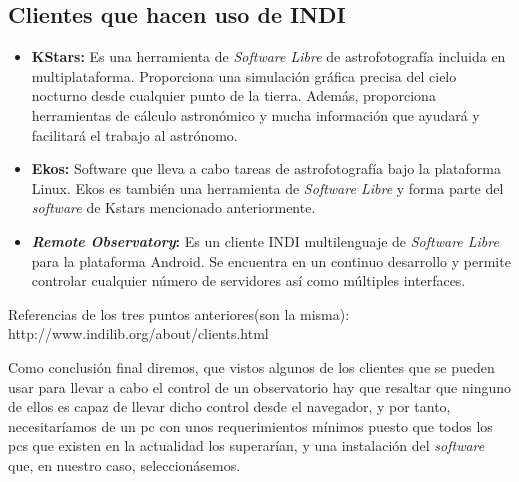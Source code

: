 \subsection{Clientes que hacen uso de INDI}
\begin{itemize}
  \item \textbf{KStars:} Es una herramienta de \textit{Software Libre} de astrofotografía incluida en multiplataforma. Proporciona una simulación gráfica precisa del cielo nocturno desde cualquier punto de la tierra. Además, proporciona herramientas de cálculo astronómico y mucha información que ayudará y facilitará el trabajo  al astrónomo.
  \item \textbf{Ekos:} Software que lleva a cabo tareas de astrofotografía bajo la plataforma Linux. Ekos es también una herramienta de \textit{Software Libre} y forma parte del \textit{software} de Kstars mencionado anteriormente.
  \item \textbf{\textit{Remote Observatory}:} Es un cliente INDI multilenguaje de \textit{Software Libre} para la plataforma Android. Se encuentra en un continuo desarrollo y permite controlar cualquier número de servidores así como múltiples interfaces.
\end{itemize}
Referencias de los tres puntos anteriores(son la misma):
http://www.indilib.org/about/clients.html

Como conclusión final diremos, que vistos algunos de los clientes que se pueden usar para llevar a cabo el control de un observatorio hay que resaltar que ninguno de ellos es capaz de llevar dicho control desde el navegador, y por tanto, necesitaríamos de un pc con unos requerimientos mínimos puesto que todos los pcs que existen en la actualidad los superarían, y una instalación del \textit{software} que, en nuestro caso, seleccionásemos.
